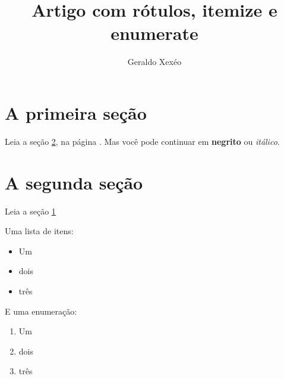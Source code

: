 \documentclass{article}
\title{Artigo com rótulos, itemize e enumerate}
\author{Geraldo Xexéo}
\begin{document}
\maketitle  

\section{A primeira seção}\label{sec:pri}
Leia a seção \ref{sec:seg}, na página \pageref{sec:seg}.
Mas você pode continuar em \textbf{negrito} ou \textit{itálico}.

\section{A segunda seção}\label{sec:seg}
Leia a seção \ref{sec:pri}

Uma lista de itens:
\begin{itemize}
    \item Um
    \item dois
    \item três
\end{itemize}

E uma enumeração:
\begin{enumerate}
    \item Um
    \item dois
    \item três
\end{enumerate}
\end{document}
